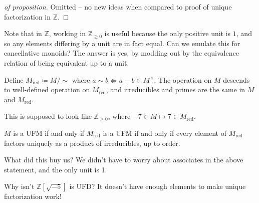 \begin{proof}[of proposition]

Omitted -- no new ideas when compared to proof of unique factorization
in \({\mathbb{Z}}\).

\end{proof}

\begin{remark}

Note that in \({\mathbb{Z}}\), working in \({\mathbb{Z}}_{\geq 0}\) is
useful because the only positive unit is \(1\), and so any elements
differing by a unit are in fact equal. Can we emulate this for
cancellative monoids? The answer is yes, by modding out by the
equivalence relation of being equivalent up to a unit.

\end{remark}

\begin{definition}

Define \(M_{{ \text{red} }}\coloneqq M/\sim\) where
\(a\sim b \iff a-b\in M^{\times}\). The operation on \(M\) descends to
well-defined operation on \(M_{{ \text{red} }}\), and irreducibles and
primes are the same in \(M\) and \(M_{{ \text{red} }}\).

\end{definition}

\begin{example}

This is supposed to look like \({\mathbb{Z}}_{\geq 0}\), where
\(-7\in M \mapsto 7 \in M_{{ \text{red} }}\).

\end{example}

\begin{proposition}

\(M\) is a UFM if and only if \(M_{{ \text{red} }}\) is a UFM if and
only if every element of \(M_{{ \text{red} }}\) factors uniquely as a
product of irreducibles, up to order.

\end{proposition}

\begin{remark}

What did this buy us? We didn't have to worry about associates in the
above statement, and the only unit is 1.

\end{remark}

\begin{remark}

Why isn't \({\mathbb{Z}}[ \sqrt{-5} ]\) is UFD? It doesn't have enough
elements to make unique factorization work!

\end{remark}

